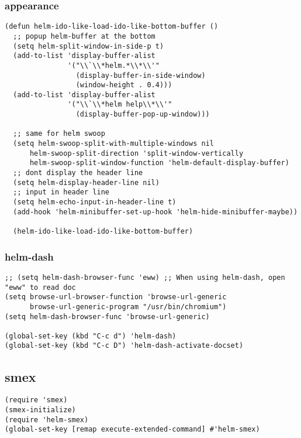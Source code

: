 \documentclass[11pt]{article}
\begin{document}
\subsubsection{appearance}
\label{sec-2-2-4}
\begin{verbatim}
(defun helm-ido-like-load-ido-like-bottom-buffer ()
  ;; popup helm-buffer at the bottom
  (setq helm-split-window-in-side-p t)
  (add-to-list 'display-buffer-alist
               '("\\`\\*helm.*\\*\\'"
                 (display-buffer-in-side-window)
                 (window-height . 0.4)))
  (add-to-list 'display-buffer-alist
               '("\\`\\*helm help\\*\\'"
                 (display-buffer-pop-up-window)))

  ;; same for helm swoop
  (setq helm-swoop-split-with-multiple-windows nil
      helm-swoop-split-direction 'split-window-vertically
      helm-swoop-split-window-function 'helm-default-display-buffer)
  ;; dont display the header line
  (setq helm-display-header-line nil)
  ;; input in header line
  (setq helm-echo-input-in-header-line t)
  (add-hook 'helm-minibuffer-set-up-hook 'helm-hide-minibuffer-maybe))

  (helm-ido-like-load-ido-like-bottom-buffer)
\end{verbatim}
\subsubsection{helm-dash}
\label{sec-2-2-5}
\begin{verbatim}
;; (setq helm-dash-browser-func 'eww) ;; When using helm-dash, open "eww" to read doc
(setq browse-url-browser-function 'browse-url-generic
      browse-url-generic-program "/usr/bin/chromium")
(setq helm-dash-browser-func 'browse-url-generic)

(global-set-key (kbd "C-c d") 'helm-dash)
(global-set-key (kbd "C-c D") 'helm-dash-activate-docset)
\end{verbatim}
\subsection{smex}
\label{sec-2-3}
\begin{verbatim}
(require 'smex)
(smex-initialize)
(require 'helm-smex)
(global-set-key [remap execute-extended-command] #'helm-smex)
\end{verbatim}
\end{document}
